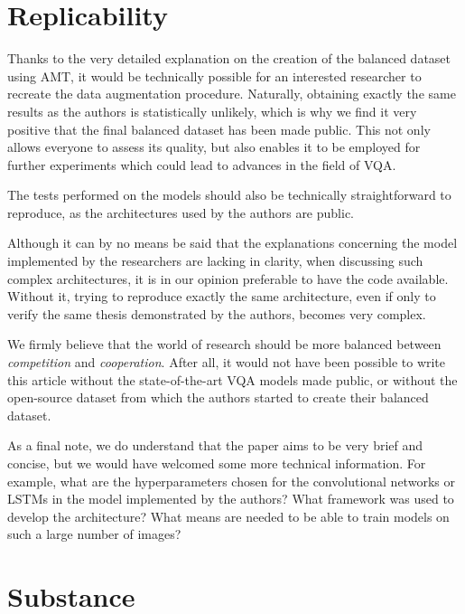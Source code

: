 \documentclass[letterpaper,11pt]{article}
\begin{document}

\section{Replicability}
\label{sec:replicability}

Thanks to the very detailed explanation on the creation of the balanced dataset using AMT, it would be technically possible for an interested researcher to recreate the data augmentation procedure. Naturally, obtaining exactly the same results as the authors is statistically unlikely, which is why we find it very positive that the final balanced dataset has been made public. This not only allows everyone to assess its quality, but also enables it to be employed for further experiments which could lead to advances in the field of VQA. 

The tests performed on the models should also be technically straightforward to reproduce, as the architectures used by the authors are public.

Although it can by no means be said that the explanations concerning the model implemented by the researchers are lacking in clarity, when discussing such complex architectures, it is in our opinion preferable to have the code available. Without it, trying to reproduce exactly the same architecture, even if only to verify the same thesis demonstrated by the authors, becomes very complex.

We firmly believe that the world of research should be more balanced between \textit{competition} and \textit{cooperation}. After all, it would not have been possible to write this article without the state-of-the-art VQA models made public, or without the open-source dataset from which the authors started to create their balanced dataset. 

As a final note, we do understand that the paper aims to be very brief and concise, but we would have welcomed some more technical information. For example, what are the hyperparameters chosen for the convolutional networks or LSTMs in the model implemented by the authors? What framework was used to develop the architecture? What means are needed to be able to train models on such a large number of images?


\section{Substance}
\end{document}
